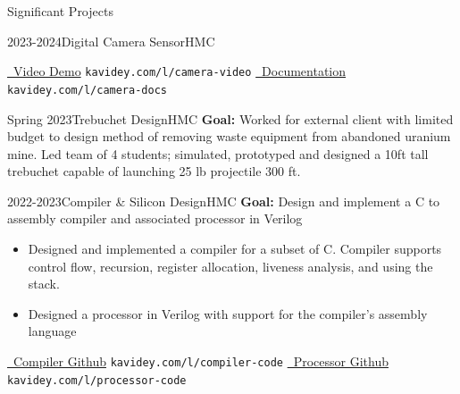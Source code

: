 \documentclass[]{mcdowellcv}
\begin{document}
\begin{cvsection}{Significant Projects}
\begin{cvsubsection}{2023-2024}{Digital Camera Sensor}{HMC}
\begin{itemize}
		\end{itemize}
		\href{https://www.youtube.com/shorts/lJYW2ZMiyLE}{\faYoutube \ Video Demo} \texttt{kavidey.com/l/camera-video}
		\href{https://kavidey.github.io/NeoObscura/}{\faBook \ Documentation} \texttt{kavidey.com/l/camera-docs}
	\end{cvsubsection}
	\begin{cvsubsection}{Spring 2023}{\hypertarget{trebuchet_design}{Trebuchet Design}}{HMC}
		\textbf{Goal:} Worked for external client with limited budget to design method of removing waste equipment from abandoned uranium mine.
		Led team of 4 students; simulated, prototyped and designed a 10ft tall trebuchet capable of launching 25 lb projectile 300 ft.
	\end{cvsubsection}
	\begin{cvsubsection}{2022-2023}{Compiler \& Silicon Design}{HMC}
		\textbf{Goal:} Design and implement a C to assembly compiler and associated processor in Verilog
		\begin{itemize}
			\item Designed and implemented a compiler for a subset of C. Compiler supports control flow, recursion, register allocation, liveness analysis, and using the stack.
			\item Designed a processor in Verilog with support for the compiler's assembly language
		\end{itemize}
		\href{https://github.com/kavidey/HMMM-Compiler/}{\faGithub \ Compiler Github} \texttt{kavidey.com/l/compiler-code}
		\href{https://github.com/kavidey/Hmmm-Silicon/tree/main/verilog/rtl/hmmm/}{\faGithub \ Processor Github} \texttt{kavidey.com/l/processor-code}
	\end{cvsubsection}

\end{cvsection}
\end{document}
